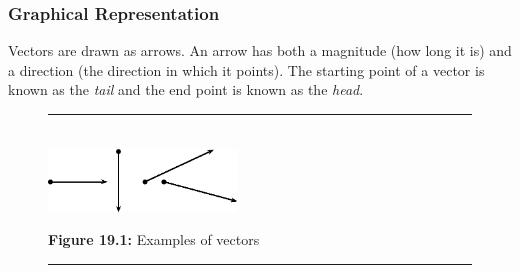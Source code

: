       \label{m38812*uid2}
            \subsubsection{ Graphical Representation}
            \nopagebreak
            
        
        \label{m38812*id186285}Vectors are drawn as arrows. An arrow has both a magnitude (how long it is) and a direction (the direction in which it points). The starting point of a vector is known as the \textsl{tail} and the end point is known as the \textsl{head}.\par 
        
    \setcounter{subfigure}{0}


	\begin{figure}[H] %
    \begin{center}
    \rule[.1in]{\figurerulewidth}{.005in} \\
        \label{m38812*uid3!!!underscore!!!media}\label{m38812*uid3!!!underscore!!!printimage}\includegraphics[width=5cm]{col11305.imgs/m38812_PG11C1_001.png} %
        
      \vspace{2pt}
    \vspace{\rubberspace}\par \begin{cnxcaption}
	  \small \textbf{Figure 19.1: }Examples of vectors
	\end{cnxcaption}
      
    \vspace{.1in}
    \rule[.1in]{\figurerulewidth}{.005in} \\
        
    \end{center}

 \end{figure}   

    \addtocounter{footnote}{-0}
    
        
    \setcounter{subfigure}{0}


